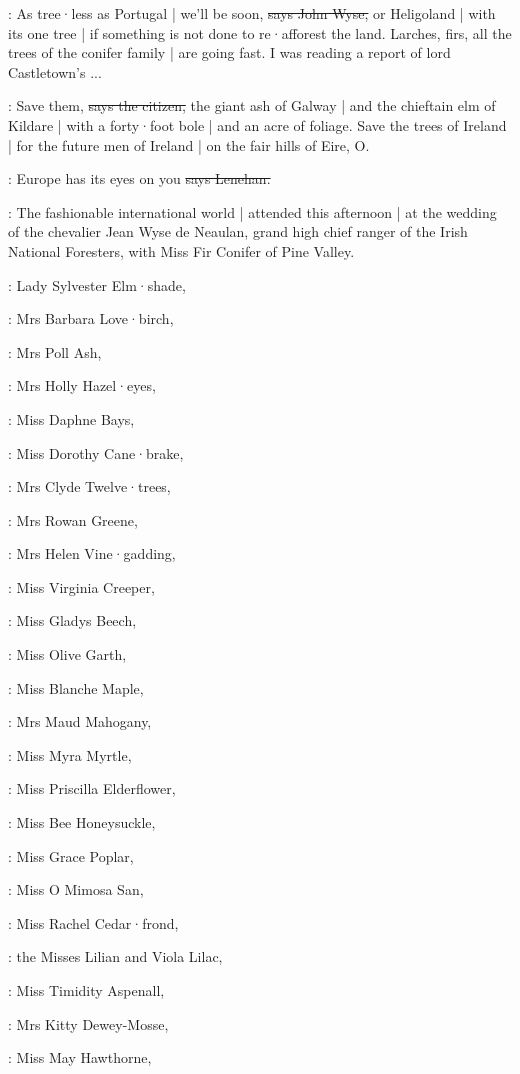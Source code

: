\johnwyse:
As tree·less as Portugal |
we'll be soon,
\sout{says John Wyse,}
or Heligoland |
with its one tree |
if something is not done to re·afforest the land.
Larches,
firs,
all the trees of the conifer family |
are going fast.
I was reading a report of lord Castletown's ...

\citizen:
Save them,
\sout{says the citizen,}
the giant ash of Galway |
and the chieftain elm of Kildare |
with a forty·foot bole |
and an acre of foliage.
Save the trees of Ireland |
for the future men of Ireland |
on the fair hills of Eire,
O.

\lenehan:
Europe has its eyes on you
\sout{says Lenehan.}

:
The fashionable international world |
attended  this afternoon |
at the wedding of the chevalier Jean Wyse de Neaulan,
grand high chief
ranger of the Irish National Foresters,
with Miss Fir Conifer of Pine Valley.

:
Lady Sylvester Elm·shade,

:
Mrs Barbara Love·birch,

:
Mrs Poll Ash,

:
Mrs Holly Hazel·eyes,

:
Miss Daphne Bays,

:
Miss Dorothy Cane·brake,

:
Mrs Clyde Twelve·trees,

:
Mrs Rowan Greene,

:
Mrs Helen Vine·gadding,

:
Miss Virginia Creeper,

:
Miss Gladys Beech,

:
Miss Olive Garth,

:
Miss Blanche Maple,

:
Mrs Maud Mahogany,

:
Miss Myra Myrtle,

:
Miss Priscilla Elderflower,

:
Miss Bee Honeysuckle,

:
Miss Grace Poplar,

:
Miss O Mimosa San,

:
Miss Rachel Cedar·frond,

:
the Misses Lilian and Viola Lilac,

:
Miss Timidity Aspenall,

:
Mrs Kitty Dewey-Mosse,

:
Miss May Hawthorne,

